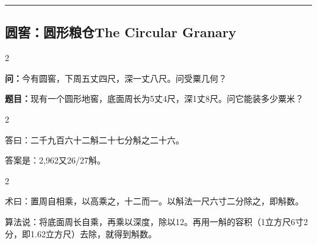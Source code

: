 \documentclass[11pt,a4paper]{article}
\newcommand{\longline}{\noindent\rule{\textwidth}{0.4pt}}
\newcommand{\bilingualsubsection}[2]{%
  \subsection{#1\hfill\normalfont\normalsize\color{sectioncolor}#2}%
}
\begin{document}
\vspace{0.5cm}
\longline
\vspace{0.3cm}

\bilingualsubsection{圆窖：圆形粮仓}{The Circular Granary}

\begin{paracol}{2}

\begin{problembox}[\CJKfamily{rm}圆窖 · 原文]
\textbf{问：}今有圆窖，下周五丈四尺，深一丈八尺。问受粟几何？
\end{problembox}

\switchcolumn

\begin{problembox}
\textbf{题目：}现有一个圆形地窖，底面周长为5丈4尺，深1丈8尺。问它能装多少粟米？
\end{problembox}

\end{paracol}

\vspace{0.2cm}

\begin{paracol}{2}

\begin{answerbox}[\CJKfamily{rm}答 · 原文]
答曰：二千九百六十二斛二十七分斛之二十六。
\end{answerbox}

\switchcolumn

\begin{answerbox}[白话文：答案]
答案是：2,962又26/27斛。
\end{answerbox}

\end{paracol}

\vspace{0.2cm}

\begin{paracol}{2}

\begin{methodbox}[\CJKfamily{rm}术 · 原文]
术曰：置周自相乘，以高乘之，十二而一。以斛法一尺六寸二分除之，即斛数。
\end{methodbox}

\switchcolumn

\begin{methodbox}
算法说：将底面周长自乘，再乘以深度，除以12。再用一斛的容积（1立方尺6寸2分，即1.62立方尺）去除，就得到斛数。
\end{methodbox}

\end{paracol}
\end{document}
